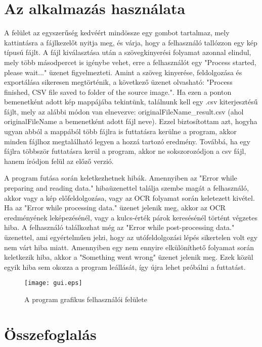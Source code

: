 \documentclass[12pt]{report}
\begin{document}
\section{Az alkalmazás használata}
A felület az egyszerűség kedvéért mindössze egy gombot tartalmaz, mely kattintásra a fájlkezelőt nyitja meg, és várja, hogy a felhasználó tallózzon egy kép típusú fájlt. A fájl kiválasztása után a szövegkinyerési folyamat azonnal elindul, mely több másodpercet is igénybe vehet, erre a felhasználót egy "Process started, please wait..." üzenet figyelmezteti. Amint a szöveg kinyerése, feldolgozása és exportálása sikeresen megtörténik, a következő üzenet olvasható: "Process finished, CSV file saved to folder of the source image.".
Ha ezen a ponton bemenetként adott kép mappájába tekintünk, találnunk kell egy .csv kiterjesztésű fájlt, mely az alábbi módon van elnevezve: originalFileName\_result.csv (ahol originalFileName a bemenetként adott fájl neve). Ezzel biztosítottam azt, hogyha ugyan abból a mappából több fájlra is futtatásra kerülne a program, akkor minden fájlhoz megtalálható legyen a hozzá tartozó eredmény. Továbbá, ha egy fájlra többször futtatásra kerül a program, akkor ne sokszorozódjon a csv fájl, hanem íródjon felül az előző verzió.

A program futása során keletkezhetnek hibák. Amennyiben az "Error while preparing and reading data." hibaüzenettel találja szembe magát a felhasználó, akkor vagy a kép előfeldolgozása, vagy az OCR folyamat során keletezett kivétel. Ha az "Error while processing data." üzenet jelenik meg, akkor az OCR eredményének leképezésénél, vagy a kulcs-érték párok keresésénél történt végzetes hiba.
A felhasználó találkozhat még az "Error while post-processing data." üzenettel, ami egyértelműen jelzi, hogy az utófeldolgozási lépés sikertelen volt egy nem várt hiba miatt. Amennyiben egy nem ennyire elkülöníthető folyamat során keletkezik hiba, akkor a "Something went wrong" üzenet jelenik meg. Ezek közül egyik hiba sem okozza a program leállását, így újra lehet próbálni a futtatást.

\begin{figure}[h]
    \centerline{\texttt{[image: gui.eps]}}
    \caption{A program grafikus felhasználói felülete}
\end{figure}

\section{Összefoglalás}
\end{document}
